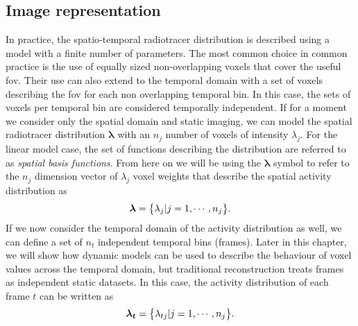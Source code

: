 \subsection{Image representation}
In practice, the spatio-temporal radiotracer distribution is described using a model with a finite number of parameters. The most common choice in common practice is the use of equally sized non-overlapping voxels that cover the useful \gls{fov}. Their use can also extend to the temporal domain with a set of voxels describing the \gls{fov} for each non overlapping temporal bin. In this case, the sets of voxels per temporal bin are considered temporally independent.
If for a moment we consider only the spatial domain and static imaging, we can model the spatial radiotracer distribution $\bm{\lambda}$
with an ${n_{j}}$ number of voxels%
of intensity $\lambda_j$. For the linear model case, the set of functions describing the distribution are referred to as \textit{spatial basis functions}. From here on we will be using the $\bm\lambda$ symbol to refer to the ${n_{j}}$ dimension vector of $\lambda_j$ voxel weights that describe the spatial activity distribution as \begin{equation}
   \bm\lambda = \big\{ \lambda_j| j=1,\cdots,n_j \big\} \\.
\end{equation}
If we now consider the temporal domain of the activity distribution as well, we can define a set of $n_t$ independent temporal bins (frames). Later in this chapter, we will show how dynamic models can be used to describe the behaviour of voxel values across the temporal domain, but traditional reconstruction treats frames as independent static datasets.
In this case, the activity distribution of each frame $t$ can be written as
\begin{equation}
   \bm{\lambda_t} = \big\{ {\lambda_{tj}| j=1,\cdots,n_j} \big\} \\.
\end{equation}
